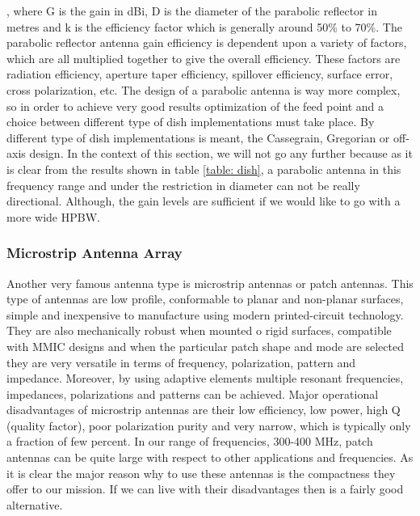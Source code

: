 , where G is the gain in dBi, D is the diameter of the parabolic reflector in metres and k is the efficiency factor which is generally around 50\% to 70\%. The parabolic reflector antenna gain efficiency is dependent upon a variety of factors, which are all multiplied together to give the overall efficiency. These factors are radiation efficiency, aperture taper efficiency, spillover efficiency, surface error, cross polarization, etc. The design of a parabolic antenna is way more complex, so in order to achieve very good results optimization of the feed point and a choice between different type of dish implementations must take place. By different type of dish implementations is meant, the Cassegrain, Gregorian or off-axis design. In the context of this section, we will not go any further because as it is clear from the results shown in table \ref{table: dish}, a parabolic antenna in this frequency range and under the restriction in diameter can not be really directional. Although, the gain levels are sufficient if we would like to go with a more wide HPBW.  



\subsubsection{Microstrip Antenna Array}
\label{microstrip antenna}

Another very famous antenna type is microstrip antennas or patch antennas. This type of antennas are low profile, conformable to planar and non-planar surfaces, simple and inexpensive to manufacture using modern printed-circuit technology. They are also mechanically robust when mounted o rigid surfaces, compatible with MMIC designs and when the particular patch shape and mode are selected they are very versatile in terms of frequency, polarization, pattern and impedance. Moreover, by using adaptive elements multiple resonant frequencies, impedances, polarizations and patterns can be achieved. Major operational disadvantages of microstrip antennas are their low efficiency, low power, high Q (quality factor), poor polarization purity and very narrow, which is typically only a fraction of few percent. In our range of frequencies, 300-400 MHz, patch antennas can be quite large with respect to other applications and frequencies. As it is clear the major reason why to use these antennas is the compactness they offer to our mission. If we can live with their disadvantages then is a fairly good alternative. 

